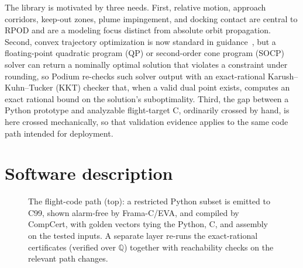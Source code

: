 \documentclass[11pt]{article}
\newcommand{\Q}{\mathbb{Q}}
\begin{document}
The library is motivated by three needs. First, relative motion, approach
corridors, keep-out zones, plume impingement, and docking contact are central to
RPOD and are a modeling focus distinct from absolute orbit propagation. Second,
convex trajectory
optimization is now standard in guidance~\cite{acikmese2007,acikmese2011,szmuk2018,malyuta2022}, but a
floating-point quadratic program (QP) or second-order cone program (SOCP) solver
can return a
nominally optimal solution that violates a constraint under rounding, so Podium
re-checks such solver output with an exact-rational Karush--Kuhn--Tucker (KKT)
checker that, when a valid dual point exists, computes an exact rational bound on
the solution's suboptimality.
Third, the gap between a Python prototype and
analyzable flight-target C, ordinarily crossed by hand, is here crossed
mechanically, so that validation evidence applies to the same code path intended
for deployment.

\section{Software description}

\begin{figure}[tbp]
\centering
{}
\caption{The flight-code path (top): a restricted Python subset is emitted to
C99, shown alarm-free by Frama-C/EVA, and compiled by CompCert, with golden
vectors tying the Python, C, and assembly on the tested inputs. A separate layer
re-runs the exact-rational certificates (verified over $\Q$) together with
reachability checks on the relevant path changes.}
\label{fig:arch}
\end{figure}
\end{document}
